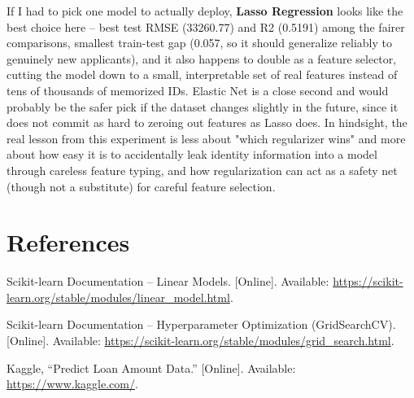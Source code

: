 \documentclass[12pt,a4paper]{article}
\begin{document}
If I had to pick one model to actually deploy, \textbf{Lasso Regression} looks like the best choice here -- best test RMSE (33260.77) and R2 (0.5191) among the fairer comparisons, smallest train-test gap (0.057, so it should generalize reliably to genuinely new applicants), and it also happens to double as a feature selector, cutting the model down to a small, interpretable set of real features instead of tens of thousands of memorized IDs. Elastic Net is a close second and would probably be the safer pick if the dataset changes slightly in the future, since it does not commit as hard to zeroing out features as Lasso does. In hindsight, the real lesson from this experiment is less about "which regularizer wins" and more about how easy it is to accidentally leak identity information into a model through careless feature typing, and how regularization can act as a safety net (though not a substitute) for careful feature selection.

\section{References}
\begin{enumerate}[label={[\arabic*]}]
\item Scikit-learn Documentation -- Linear Models. [Online]. Available: \url{https://scikit-learn.org/stable/modules/linear_model.html}.
\item Scikit-learn Documentation -- Hyperparameter Optimization (GridSearchCV). [Online]. Available: \url{https://scikit-learn.org/stable/modules/grid_search.html}.
\item Kaggle, ``Predict Loan Amount Data.'' [Online]. Available: \url{https://www.kaggle.com/}.
\end{enumerate}
\end{document}
